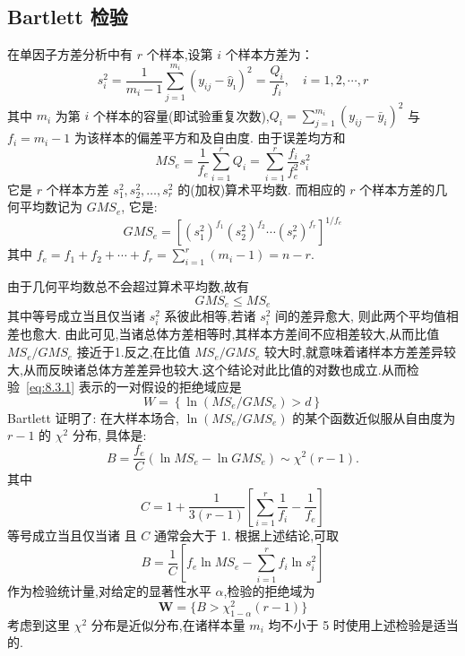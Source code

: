 \subsection{Bartlett 检验}
在单因子方差分析中有 $r$ 个样本,设第 $i$ 个样本方差为：
\begin{equation*}
  s_{i}^{2}=\frac{1}{m_{i}-1} \sum_{j=1}^{m_{i}}\left(y_{i j}-\hat{y}_{\imath}\right)^{2}=\frac{Q_{i}}{f_{i}}, \quad i=1,2, \cdots, r
\end{equation*}
其中 $m_i$ 为第 $i$ 个样本的容量(即试验重复次数),$Q_i = \sum_{j=1}^{m_i} (y_{ij} - \bar{y}_i)^2$ 与 $f_i =m_i -1$ 为该样本的偏差平方和及自由度. 由于误差均方和
\begin{equation*}
  M S_{e}=\frac{1}{f_{e}} \sum_{i=1}^{r} Q_{i}=\sum_{i=1}^{r} \frac{f_{i}}{f_{e}^{2}} s_{i}^{2}
\end{equation*}
它是 $r$ 个样本方差 $s_1^2,s_2^2, \ldots, s_r^2$ 的(加权)算术平均数. 而相应的 $r$ 个样本方差的几何平均数记为 $GMS_e$, 它是:
\begin{equation*}
  GMS_e = [(s_1^2)^{f_1}(s_2^2)^{f_2} \cdots (s_r^2)^{f_r}]^{1/f_e}
\end{equation*}
其中 $f_e = f_1 + f_2 + \cdots + f_r = \sum_{i=1}^r(m_i - 1) = n-r$.

由于几何平均数总不会超过算术平均数,故有
\begin{equation}
  GMS_e \leq MS_e
\end{equation}
其中等号成立当且仅当诸 $s_i^2$ 系彼此相等,若诸 $s_i^2$ 间的差异愈大, 则此两个平均值相差也愈大. 由此可见,当诸总体方差相等时,其样本方差间不应相差较大,从而比值 $MS_e/GMS_e$ 接近于1.反之,在比值 $MS_e/GMS_e$ 较大时,就意味着诸样本方差差异较大,从而反映诸总体方差差异也较大.这个结论对此比值的对数也成立.从而检验~\eqref{eq:8.3.1} 表示的一对假设的拒绝域应是
\begin{equation}\label{eq:8.3.4}
  W=\left\{\ln \left(M S_{e} / G M S_{e}\right)>d\right\}
\end{equation}
Bartlett 证明了: 在大样本场合, $\ln(MS_e/GMS_e)$ 的某个函数近似服从自由度为 $r-1$ 的 $\chi^2$ 分布, 具体是:
\begin{equation}\label{eq:8.3.5}
  B=\frac{f_{e}}{C}(\ln M S_{e}-\ln G M S_{e}) \sim \chi^{2}(r-1).
\end{equation}
其中
\begin{equation}\label{eq:8.3.6}
  C = 1 + \frac{1}{3(r-1)} \left[\sum_{i=1}^{r} \frac{1}{f_{i}}-\frac{1}{f_{e}}\right]
\end{equation}
等号成立当且仅当诸
且 $C$ 通常会大于 1. 根据上述结论,可取
\begin{equation}\label{eq:8.3.7}
  B=\frac{1}{C}\left[f_{e} \ln M S_{e}-\sum_{i=1}^{r} f_{i} \ln s_{i}^{2}\right]
\end{equation}
作为检验统计量,对给定的显著性水平 $\alpha$,检验的拒绝域为
\begin{equation}
  \boldsymbol{W}=\{ B>\chi_{1-\alpha}^{2}(r-1) \}
\end{equation}
考虑到这里 $\chi^2$ 分布是近似分布,在诸样本量 $m_i$ 均不小于 5 时使用上述检验是适当的.

